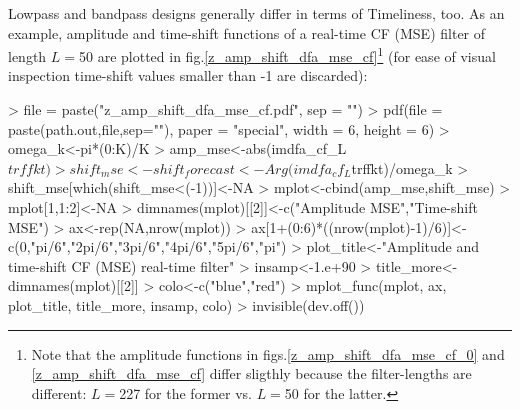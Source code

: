 \documentclass[a4paper]{book}
\begin{document}
Lowpass and bandpass designs generally differ in terms of Timeliness, too. As an example, amplitude and time-shift functions of a real-time CF (MSE) filter of length $L=$50 are plotted in fig.\ref{z_amp_shift_dfa_mse_cf}\footnote{Note that the amplitude functions in figs.\ref{z_amp_shift_dfa_mse_cf_0} and \ref{z_amp_shift_dfa_mse_cf} differ sligthly because the filter-lengths are different: $L=$227 for the former vs. $L=$50 for the latter.} (for ease of visual inspection time-shift values smaller than -1 are discarded):
\begin{Schunk}
\begin{Sinput}
> file = paste("z_amp_shift_dfa_mse_cf.pdf", sep = "")
> pdf(file = paste(path.out,file,sep=""), paper = "special", width = 6, height = 6)
> omega_k<-pi*(0:K)/K
> amp_mse<-abs(imdfa_cf_L$trffkt)
> shift_mse<-shift_forecast<-Arg(imdfa_cf_L$trffkt)/omega_k
> shift_mse[which(shift_mse<(-1))]<-NA
> mplot<-cbind(amp_mse,shift_mse)
> mplot[1,1:2]<-NA
> dimnames(mplot)[[2]]<-c("Amplitude MSE","Time-shift MSE")
> ax<-rep(NA,nrow(mplot))
> ax[1+(0:6)*((nrow(mplot)-1)/6)]<-c(0,"pi/6","2pi/6","3pi/6","4pi/6","5pi/6","pi")
> plot_title<-"Amplitude and time-shift CF (MSE) real-time filter"
> insamp<-1.e+90
> title_more<-dimnames(mplot)[[2]]
> colo<-c("blue","red")
> mplot_func(mplot, ax, plot_title, title_more, insamp, colo)
> invisible(dev.off())
\end{Sinput}
\end{Schunk}
\end{document}
